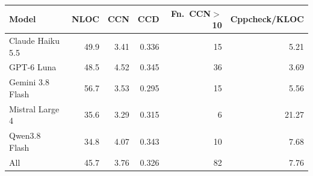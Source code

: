 \begin{tabular}{@{}lrrrrr@{}}
\toprule
Model & NLOC & CCN & CCD & Fn.\ CCN$>$10 & Cppcheck/KLOC \\
\midrule
Claude Haiku 5.5 & 49.9 & 3.41 & 0.336 & 15 & 5.21 \\
GPT-6 Luna & 48.5 & 4.52 & 0.345 & 36 & 3.69 \\
Gemini 3.8 Flash & 56.7 & 3.53 & 0.295 & 15 & 5.56 \\
Mistral Large 4 & 35.6 & 3.29 & 0.315 & 6 & 21.27 \\
Qwen3.8 Flash & 34.8 & 4.07 & 0.343 & 10 & 7.68 \\
\midrule
All & 45.7 & 3.76 & 0.326 & 82 & 7.76 \\
\bottomrule
\end{tabular}
